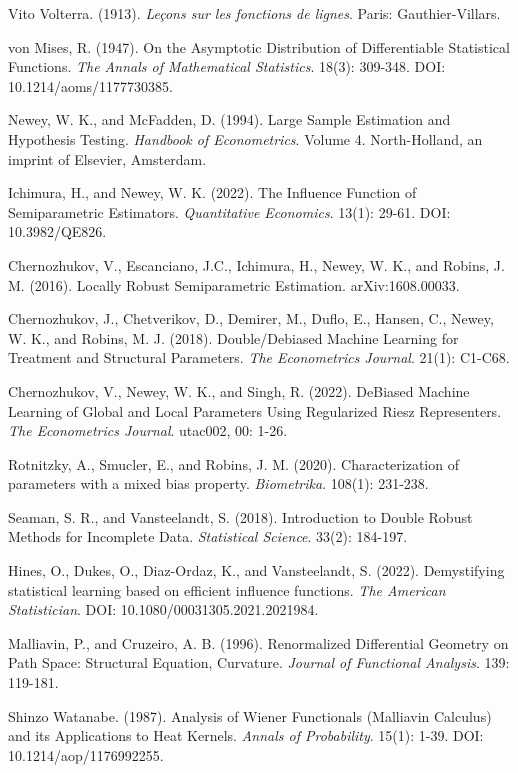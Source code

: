 \documentclass[uplatex,dvipdfmx]{jsreport}
\begin{document}
\begin{thebibliography}{99}
    \item
    Vito Volterra. (1913). \textit{Le\c{c}ons sur les fonctions de lignes}. Paris: Gauthier-Villars.
    \item 
    von Mises, R. (1947). On the Asymptotic Distribution of Differentiable Statistical Functions. \textit{The Annals of Mathematical Statistics}. 18(3): 309-348. DOI: 10.1214/aoms/1177730385.
    \item
    Newey, W. K., and McFadden, D. (1994). Large Sample Estimation and Hypothesis Testing. \textit{Handbook of Econometrics}. Volume 4. North-Holland, an imprint of Elsevier, Amsterdam.
    \item
    Ichimura, H., and Newey, W. K. (2022). The Influence Function of Semiparametric Estimators. \textit{Quantitative Economics}. 13(1): 29-61. DOI: 10.3982/QE826.
    \item
    Chernozhukov, V., Escanciano, J.C., Ichimura, H., Newey, W. K., and Robins, J. M. (2016). Locally Robust Semiparametric Estimation. arXiv:1608.00033.
    \item
    Chernozhukov, J., Chetverikov, D., Demirer, M., Duflo, E., Hansen, C., Newey, W. K., and Robins, M. J. (2018). Double/Debiased Machine Learning for Treatment and Structural Parameters. \textit{The Econometrics Journal}. 21(1): C1-C68.
    \item
    Chernozhukov, V., Newey, W. K., and Singh, R. (2022). DeBiased Machine Learning of Global and Local Parameters Using Regularized Riesz Representers. \textit{The Econometrics Journal}. utac002, 00: 1-26.
    \item
    Rotnitzky, A., Smucler, E., and Robins, J. M. (2020). Characterization of parameters with a mixed bias property. \textit{Biometrika}. 108(1): 231-238.
    \item
    Seaman, S. R., and Vansteelandt, S. (2018). Introduction to Double Robust Methods for Incomplete Data. \textit{Statistical Science}. 33(2): 184-197.
    \item
    Hines, O., Dukes, O., Diaz-Ordaz, K., and Vansteelandt, S. (2022). Demystifying statistical learning based on efficient influence functions. \textit{The American Statistician}. DOI: 10.1080/00031305.2021.2021984.
    \item
    Malliavin, P., and Cruzeiro, A. B. (1996). Renormalized Differential Geometry on Path Space: Structural Equation, Curvature. \textit{Journal of Functional Analysis}. 139: 119-181.
    \item
    Shinzo Watanabe. (1987). Analysis of Wiener Functionals (Malliavin Calculus) and its Applications to Heat Kernels. \textit{Annals of Probability}. 15(1): 1-39. DOI: 10.1214/aop/1176992255.

\end{thebibliography}
\end{document}
